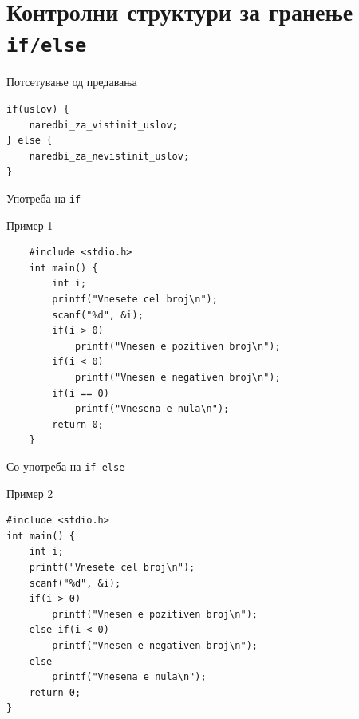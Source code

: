 \section{Контролни структури за гранење \texttt{if/else}}

\begin{frame}[fragile]{Потсетување од предавања}
\begin{center}
\begin{lstlisting}
if(uslov) {
    naredbi_za_vistinit_uslov;
} else {
    naredbi_za_nevistinit_uslov;
}
\end{lstlisting}
\end{center}
\end{frame}

\begin{frame}[fragile]{Употреба на \texttt{if}}
    \begin{exampleblock}{Пример 1}
    \begin{lstlisting}
    #include <stdio.h> 
    int main() { 
        int i;
        printf("Vnesete cel broj\n");
        scanf("%d", &i);
        if(i > 0) 
            printf("Vnesen e pozitiven broj\n");
        if(i < 0)
            printf("Vnesen e negativen broj\n"); 
        if(i == 0)
            printf("Vnesena e nula\n"); 
        return 0; 
    }
    \end{lstlisting}
    \end{exampleblock}
\end{frame}

\begin{frame}[fragile]{Со употреба на \texttt{if-else}}

    \begin{exampleblock}{Пример 2}
    \begin{lstlisting}
#include <stdio.h>
int main() {
    int i;
    printf("Vnesete cel broj\n");
    scanf("%d", &i); 
    if(i > 0)
        printf("Vnesen e pozitiven broj\n");
    else if(i < 0)
        printf("Vnesen e negativen broj\n"); 
    else
        printf("Vnesena e nula\n"); 
    return 0; 
}
    \end{lstlisting}
    \end{exampleblock}

\end{frame}

